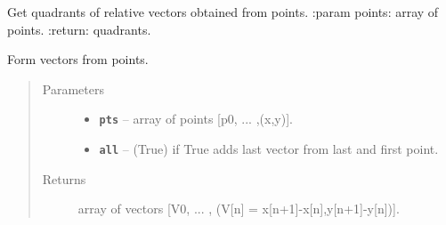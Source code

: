 \documentclass[letterpaper,10pt,english]{sphinxmanual}
\begin{document}

\begin{fulllineitems}
\label{RRtoolbox.lib.arrayops:RRtoolbox.lib.arrayops.basic.relativeQuadrants}
Get quadrants of relative vectors obtained from points.
:param points: array of points.
:return: quadrants.

\end{fulllineitems}


\begin{fulllineitems}
\label{RRtoolbox.lib.arrayops:RRtoolbox.lib.arrayops.basic.relativeVectors}
Form vectors from points.
\begin{quote}\begin{description}
\item[{Parameters}] \leavevmode\begin{itemize}
\item {} 
\textbf{\texttt{pts}} -- array of points {[}p0, ... ,(x,y){]}.

\item {} 
\textbf{\texttt{all}} -- (True) if True adds last vector from last and first point.

\end{itemize}

\item[{Returns}] \leavevmode
array of vectors {[}V0, ... , (V{[}n{]} = x{[}n+1{]}-x{[}n{]},y{[}n+1{]}-y{[}n{]}){]}.

\end{description}\end{quote}

\end{fulllineitems}

\end{document}
